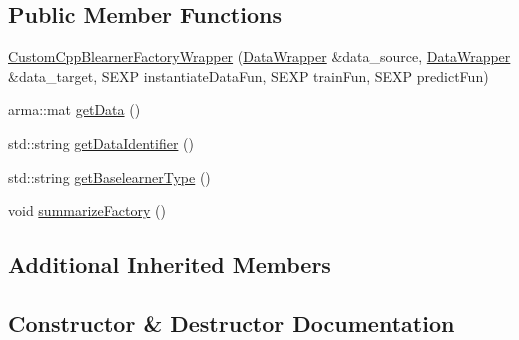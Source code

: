 \subsection*{Public Member Functions}
\begin{DoxyCompactItemize}
\item 
\mbox{\hyperlink{class_custom_cpp_blearner_factory_wrapper_a3ebf330b467d8c3f2ae2404369363877}{Custom\+Cpp\+Blearner\+Factory\+Wrapper}} (\mbox{\hyperlink{class_data_wrapper}{Data\+Wrapper}} \&data\+\_\+source, \mbox{\hyperlink{class_data_wrapper}{Data\+Wrapper}} \&data\+\_\+target, S\+E\+XP instantiate\+Data\+Fun, S\+E\+XP train\+Fun, S\+E\+XP predict\+Fun)
\item 
arma\+::mat \mbox{\hyperlink{class_custom_cpp_blearner_factory_wrapper_a0fa7f0c2574f895b66ddc363b5d869ad}{get\+Data}} ()
\item 
std\+::string \mbox{\hyperlink{class_custom_cpp_blearner_factory_wrapper_a0ec23af6dd4dc8a390465d41be516983}{get\+Data\+Identifier}} ()
\item 
std\+::string \mbox{\hyperlink{class_custom_cpp_blearner_factory_wrapper_af2779851c3e2b288614a6d7152f5e3a1}{get\+Baselearner\+Type}} ()
\item 
void \mbox{\hyperlink{class_custom_cpp_blearner_factory_wrapper_a434199d8e50058abcec1ba82c566ef0c}{summarize\+Factory}} ()
\end{DoxyCompactItemize}
\subsection*{Additional Inherited Members}


\subsection{Constructor \& Destructor Documentation}
\mbox{\label{class_custom_cpp_blearner_factory_wrapper_a3ebf330b467d8c3f2ae2404369363877}} 
